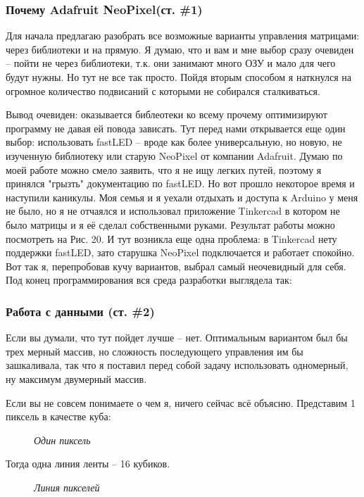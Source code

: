 \documentclass[a4paper, 12pt]{article}
\newcommand{\image}[3]{
	\begin{figure}[ht]
		\center{\texttt{[image: img/\#1]} }
		\caption{\textit{#3}}\end{figure}
}
\begin{document}
\newpage
\subsubsection{Почему  Adafruit NeoPixel(ст. \#1)}

Для начала предлагаю разобрать все возможные варианты управления матрицами:
через библиотеки и на прямую. Я думаю, что и вам и мне выбор сразу очевиден --
пойти не через библиотеки, т.к. они занимают много ОЗУ и мало для чего будут
нужны. Но тут не все так просто. Пойдя вторым способом я наткнулся на огромное
количество подвисаний с которыми не собирался сталкиваться.

Вывод очевиден: оказывается библеотеки ко всему прочему оптимизируют программу
не давая ей повода зависать. Тут перед нами открывается еще один выбор:
использовать fastLED -- вроде как более универсальную, но новую, не изученную
библиотеку или старую NeoPixel от компании Adafruit. Думаю по моей работе можно
смело заявить, что я не ищу легких путей, поэтому я принялся "грызть"
документацию по fastLED. Но вот прошло некоторое время и наступили каникулы.
Моя семья и я уехали отдыхать и доступа к Arduino у меня не было, но я не
отчаялся и использовал приложение Tinkercad в котором не было матрицы и я её
сделал собственными руками. Результат работы можно посмотреть на Рис. 20.
И тут возникла еще одна проблема: в Tinkercad нету поддержки fastLED, зато
старушка NeoPixel подключается и работает спокойно. Вот так я, перепробовав
кучу вариантов, выбрал самый неочевидный для себя. Под конец программирования
вся среда разработки выглядела так:

\newpage

\subsubsection{Работа с данными (ст. \#2)}

Если вы думали, что тут пойдет лучше -- нет. Оптимальным вариантом был бы
трех мерный массив, но сложность последующего управления им бы зашкаливала,
так что я поставил перед собой задачу использовать одномерный, ну максимум
двумерный массив.

Если вы не совсем понимаете о чем я, ничего сейчас всё объясню. Представим 1
пиксель в качестве куба:

\image{Куб.png}{150}{Один пиксель}

Тогда одна линия ленты -- 16 кубиков.

\image{Линия.png}{150}{Линия пикселей}
\end{document}
